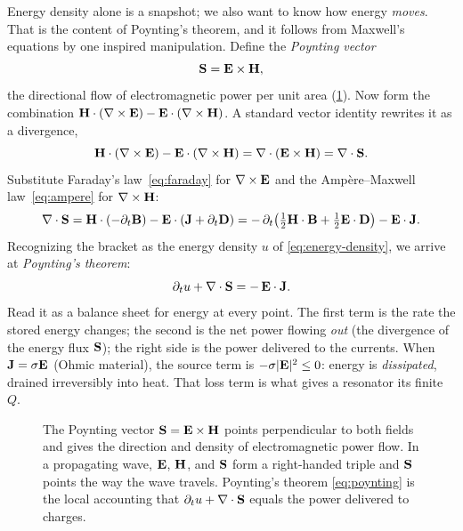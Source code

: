 Energy density alone is a snapshot; we also want to know how energy
\emph{moves}. That is the content of Poynting's theorem, and it follows from
Maxwell's equations by one inspired manipulation. Define the \emph{Poynting
vector}
\begin{equation}
  \mathbf{S} = \mathbf{E}\times\mathbf{H}, \label{eq:poynting-vec}
\end{equation}
the directional flow of electromagnetic power per unit area (\cref{fig:poynting}).
Now form the combination $\mathbf{H}\cdot(\nabla\times\mathbf{E}) - \mathbf{E}\cdot(\nabla\times\mathbf{H})$. A standard
vector identity rewrites it as a divergence,
\[
  \mathbf{H}\cdot(\nabla\times\mathbf{E}) - \mathbf{E}\cdot(\nabla\times\mathbf{H}) = \nabla\cdot(\mathbf{E}\times\mathbf{H}) = \nabla\cdot\mathbf{S}.
\]
Substitute Faraday's law~\eqref{eq:faraday} for $\nabla\times\mathbf{E}$ and the
Amp\`ere--Maxwell law~\eqref{eq:ampere} for $\nabla\times\mathbf{H}$:
\[
  \nabla\cdot\mathbf{S}
  = \mathbf{H}\cdot(-\partial_t\mathbf{B}) - \mathbf{E}\cdot(\mathbf{J} + \partial_t\mathbf{D})
  = -\,\partial_t\!\left(\tfrac12\mathbf{H}\cdot\mathbf{B} + \tfrac12\mathbf{E}\cdot\mathbf{D}\right)
    - \mathbf{E}\cdot\mathbf{J}.
\]
Recognizing the bracket as the energy density $u$ of
\eqref{eq:energy-density}, we arrive at \emph{Poynting's theorem}:
\begin{equation}
  \partial_t u + \nabla\cdot\mathbf{S} = -\,\mathbf{E}\cdot\mathbf{J}. \label{eq:poynting}
\end{equation}
Read it as a balance sheet for energy at every point. The first term is the
rate the stored energy changes; the second is the net power flowing \emph{out}
(the divergence of the energy flux $\mathbf{S}$); the right side is the power
delivered to the currents. When $\mathbf{J}=\sigma\mathbf{E}$ (Ohmic material), the source
term is $-\sigma\lvert\mathbf{E}\rvert^2\le 0$: energy is \emph{dissipated}, drained
irreversibly into heat. That loss term is what gives a resonator its finite
$Q$.

\begin{figure}[t]
\centering
{}
\caption[The Poynting vector]{The Poynting vector $\mathbf{S}=\mathbf{E}\times\mathbf{H}$ points
perpendicular to both fields and gives the direction and density of
electromagnetic power flow. In a propagating wave, $\mathbf{E}$, $\mathbf{H}$, and $\mathbf{S}$ form
a right-handed triple and $\mathbf{S}$ points the way the wave travels. Poynting's
theorem \eqref{eq:poynting} is the local accounting that $\partial_t u+\nabla\cdot\mathbf{S}$
equals the power delivered to charges.}
\label{fig:poynting}
\end{figure}

